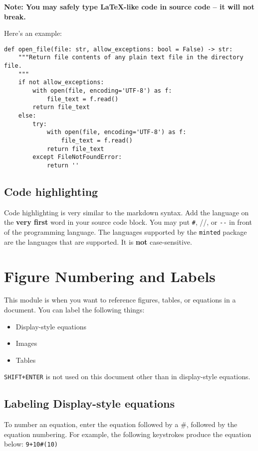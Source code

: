 \documentclass[12pt]{article}
\theoremstyle{plain}
\theoremstyle{remark}
\theoremstyle{definition}
\begin{document}
\textbf{Note: You may safely type LaTeX-like code in source code -- it
will not break.}

Here's an example:

\begin{verbatim}
def open_file(file: str, allow_exceptions: bool = False) -> str:
    """Return file contents of any plain text file in the directory file.
    """
    if not allow_exceptions:
        with open(file, encoding='UTF-8') as f:
            file_text = f.read()
        return file_text
    else:
        try:
            with open(file, encoding='UTF-8') as f:
                file_text = f.read()
            return file_text
        except FileNotFoundError:
            return ''
\end{verbatim}


\subsection{Code highlighting}

Code highlighting is very similar to the markdown syntax. Add the
language on the \textbf{very first} word in your source code block. You
may put \texttt{\#}, //, or \texttt{-\/-} in front of the programming
language. The languages supported by the \texttt{minted} package are the
languages that are supported. It is \textbf{not} case-sensitive.


\section{Figure Numbering and
Labels}

This module is when you want to reference figures, tables, or equations
in a document. You can label the following things:

\begin{itemize}
\item
  Display-style equations
\item
  Images
\item
  Tables
\end{itemize}

\texttt{SHIFT+ENTER} is not used on this document other than in
display-style equations.


\subsection{Labeling Display-style
equations}

To number an equation, enter the equation followed by a \#, followed by
the equation numbering. For example, the following keystrokes produce
the equation below: \texttt{9+10\#(10)}
\end{document}
